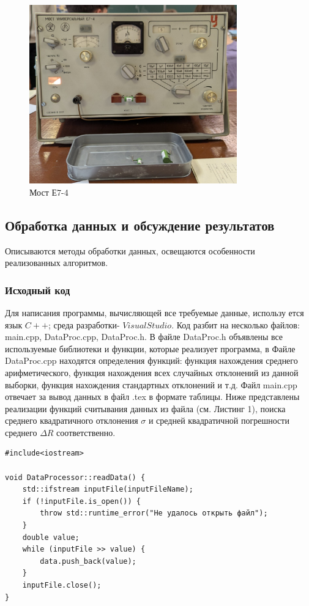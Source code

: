 \begin{figure}[ht!]
\centering
\includegraphics[width=0.8\textwidth]{установка}
\caption{Мост Е7-4}
\label{fig:device}
\end{figure}
\newpage
\subsection{Обработка данных и обсуждение результатов}
Описываются методы обработки данных, освещаются особенности реализованных алгоритмов.

\subsubsection{Исходный код}
Для написания программы, вычисляющей все требуемые данные, использу
ется язык $C++$; среда разработки- $Visual Studio$.
 Код разбит на несколько файлов: main.cpp, DataProc.cpp, DataProc.h.
 В файле DataProc.h объявлены все используемые библиотеки и функции, которые реализует программа, в Файле DataProc.cpp находятся определения функций: функция нахождения среднего арифметического, функция нахождения всех случайных отклонений из данной выборки, функция нахождения стандартных отклонений и т.д. 
 Файл main.cpp отвечает за вывод данных в файл .tex в формате таблицы.
 Ниже представлены реализации функций считывания данных из файла (см. Листинг 1), поиска среднего квадратичного отклонения $\sigma$ и средней квадратичной погрешности среднего $\Delta R$ соответственно.
\newpage
\begin{lstlisting}[label=listing1, caption=Пример листинга исходного кода]
#include<iostream>

void DataProcessor::readData() {
    std::ifstream inputFile(inputFileName);
    if (!inputFile.is_open()) {
        throw std::runtime_error("Не удалось открыть файл");
    }
    double value;
    while (inputFile >> value) {
        data.push_back(value);
    }
    inputFile.close();
}
\end{lstlisting}

